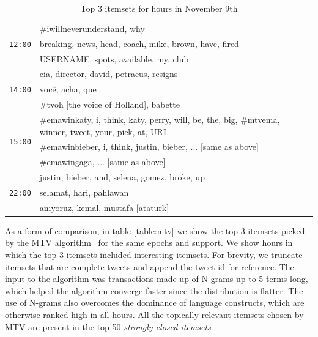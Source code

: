 \documentclass{sig-alternate}
\begin{document}
\begin{table}
\begin{center}
\small
\def\arraystretch{1.1}
\begin{tabular}{|p{.6cm}|p{7.5cm}|}

\hline
\multirow{3}{*}{\texttt{12:00}} 
& \#iwillneverunderstand, why\\\cline{2-2}
& breaking, news, head, coach, mike, brown, have, fired  \\\cline{2-2}
& USERNAME, spots, available, my, club \\\hline
\multirow{3}{*}{\texttt{14:00}} 
& cia, director, david, petraeus, resigns \\\cline{2-2}
& voc\^{e}, acha, que \\\cline{2-2}
& \#tvoh [the voice of Holland], babette \\\hline
\multirow{3}{*}{\texttt{15:00}} & \#emawinkaty, i, think, katy, perry, will, be, the, big,  \#mtvema, winner, tweet, your, pick, at, URL
\\ \cline{2-2}
& \#emawinbieber, i, think, justin, bieber, ... [same as above] \\ \cline{2-2}
& \#emawingaga, ... [same as above]  \\\hline														
\multirow{3}{*}{\texttt{22:00}} & justin, bieber, and, selena, gomez, broke, up
\\ \cline{2-2}
& selamat, hari, pahlawan \\\cline{2-2}
& aniyoruz, kemal, mustafa [ataturk] \\ \hline
\end{tabular}
\end{center}
\caption{Top 3 itemsets for hours in November 9th}
 \label{table:nov9}
\end{table}


As a form of comparison, in table \ref{table:mtv} we show the top 3 itemsets picked by the MTV algorithm~\cite{mampaey2011tell} for the same epochs and support.
% 
We show hours in which the top 3 itemsets included interesting itemsets. For brevity, we truncate itemsets that are complete tweets and append the tweet id for reference.
% 
The input to the algorithm was transactions made up of N-grams up to 5 terms long, which helped the algorithm converge faster since the distribution is flatter. 
The use of N-grams also overcomes the dominance of language constructs, which are otherwise ranked high in all hours. 
All the topically relevant itemsets chosen by MTV are present in the top 50 \emph{strongly closed itemsets}.
\end{document}
